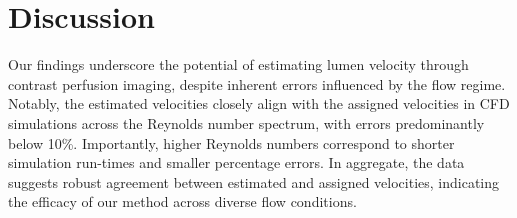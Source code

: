 \documentclass[times,twocolumn,final]{elsarticle}
\begin{document}



\section{Discussion}

Our findings underscore the potential of estimating lumen velocity through contrast perfusion imaging, despite inherent errors influenced by the flow regime. Notably, the estimated velocities closely align with the assigned velocities in CFD simulations across the Reynolds number spectrum, with errors predominantly below 10\%. Importantly, higher Reynolds numbers correspond to shorter simulation run-times and smaller percentage errors. In aggregate, the data suggests robust agreement between estimated and assigned velocities, indicating the efficacy of our method across diverse flow conditions.
\end{document}
